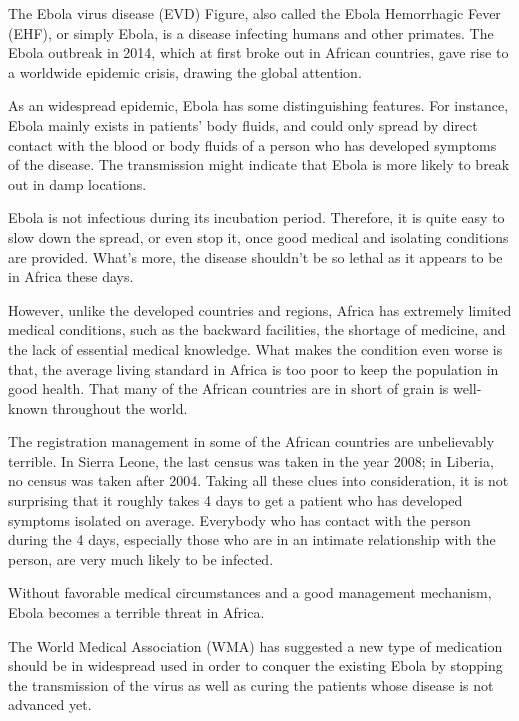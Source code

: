 \documentclass[11pt]{article}
\begin{document}
The Ebola virus disease (EVD) Figure, also called the Ebola Hemorrhagic Fever (EHF), or simply Ebola, is a disease infecting humans and other primates. The Ebola outbreak in 2014, which at first broke out in African countries, gave rise to a worldwide epidemic crisis, drawing the global attention.

As an widespread epidemic, Ebola has some distinguishing features. For instance, Ebola mainly exists in patients' body fluids, and could only spread by direct contact with the blood or body fluids of a person who has developed symptoms of the disease. The transmission might indicate that Ebola is more likely to break out in damp locations. 

Ebola is not infectious during its incubation period. %
Therefore, it is quite easy to slow down the spread, or even stop it, once good medical and isolating conditions are provided. What's more, the disease shouldn't be so lethal as it appears to be in Africa these days.

However, unlike the developed countries and regions, Africa has extremely limited medical conditions, such as the backward facilities, the shortage of medicine, and the lack of essential medical knowledge. What makes the condition even worse is that, the average living standard in Africa is too poor to keep the population in good health. That many of the African countries are in short of grain is well-known throughout the world.

The registration management in some of the African countries are unbelievably terrible. In Sierra Leone, the last census was taken in the year 2008; in Liberia, no census was taken after 2004. Taking all these clues into consideration, it is not surprising that it roughly takes 4 days \cite{Sitrep} to get a patient who has developed symptoms isolated on average. Everybody who has contact with the person during the 4 days, especially those who are in an intimate relationship with the person, are very much likely to be infected.

Without favorable medical circumstances and a good management mechanism, Ebola becomes a terrible threat in Africa.

The World Medical Association (WMA) has suggested a new type of medication should be in widespread used in order to conquer the existing Ebola by stopping the transmission of the virus as well as curing the patients whose disease is not advanced yet. 
\end{document}
